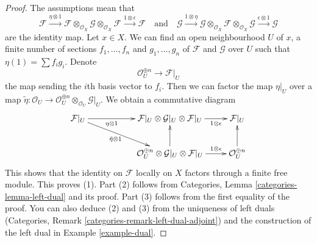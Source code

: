 \documentclass[10pt,a4paper]{amsart}
\theoremstyle{plain}
\theoremstyle{definition}
\theoremstyle{remark}
\numberwithin{equation}{subsection}
\begin{document}
\begin{proof}
The assumptions mean that
$$
\mathcal{F} \xrightarrow{\eta \otimes 1}
\mathcal{F} \otimes_{\mathcal{O}_X} \mathcal{G}
\otimes_{\mathcal{O}_X} \mathcal{F}
\xrightarrow{1 \otimes \epsilon} \mathcal{F}
\quad\text{and}\quad
\mathcal{G} \xrightarrow{1 \otimes \eta}
\mathcal{G} \otimes_{\mathcal{O}_X} \mathcal{F}
\otimes_{\mathcal{O}_X} \mathcal{G}
\xrightarrow{\epsilon \otimes 1} \mathcal{G}
$$
are the identity map. Let $x \in X$. We can find an open neighbourhood
$U$ of $x$, a finite number of sections $f_1, \ldots, f_n$
and $g_1, \ldots, g_n$ of
$\mathcal{F}$ and $\mathcal{G}$ over $U$ such that
$\eta(1) = \sum f_i g_i$. Denote
$$
\mathcal{O}_U^{\oplus n} \to \mathcal{F}|_U
$$
the map sending the $i$th basis vector to $f_i$. Then we
can factor the map $\eta|_U$ over a map
$\tilde \eta : \mathcal{O}_U \to
\mathcal{O}_U^{\oplus n} \otimes_{\mathcal{O}_U} \mathcal{G}|_U$.
We obtain a commutative diagram
$$
\xymatrix{
\mathcal{F}|_U
\ar[rr]_-{\eta \otimes 1} \ar[rrd]_-{\tilde \eta \otimes 1} & &
\mathcal{F}|_U \otimes \mathcal{G}|_U \otimes \mathcal{F}|_U
\ar[r]_-{1 \otimes \epsilon} &
\mathcal{F}|_U \\
& &
\mathcal{O}_U^{\oplus n} \otimes \mathcal{G}|_U \otimes \mathcal{F}|_U
\ar[u] \ar[r]^-{1 \otimes \epsilon} &
\mathcal{O}_U^{\oplus n} \ar[u]
}
$$
This shows that the identity on $\mathcal{F}$ locally on $X$
factors through a finite free module. This proves (1). Part (2) follows from
Categories, Lemma \ref{categories-lemma-left-dual} and its proof.
Part (3) follows from the first equality of the proof.
You can also deduce (2) and (3) from the uniqueness of left duals
(Categories, Remark \ref{categories-remark-left-dual-adjoint})
and the construction of the left dual in
Example \ref{example-dual}.
\end{proof}
\end{document}
